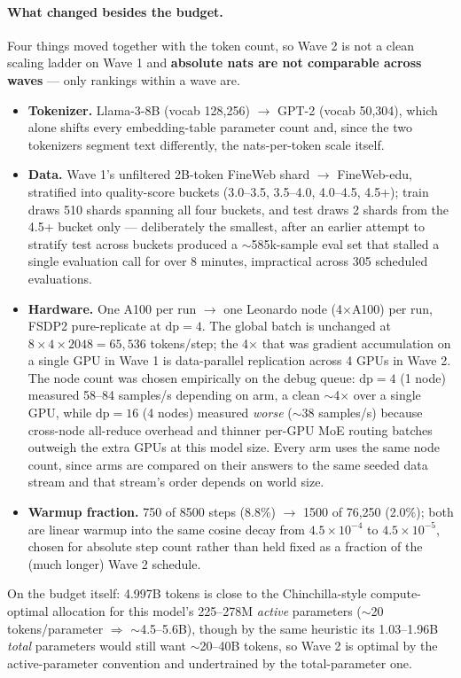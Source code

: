 \documentclass[11pt,a4paper]{article}
\begin{document}
\paragraph{What changed besides the budget.} Four things moved together with the token count, so
Wave 2 is not a clean scaling ladder on Wave 1 and \textbf{absolute nats are not comparable across
waves} --- only rankings within a wave are.
\begin{itemize}
  \item \textbf{Tokenizer.} Llama-3-8B (vocab 128{,}256) $\to$ GPT-2 (vocab 50{,}304), which alone
    shifts every embedding-table parameter count and, since the two tokenizers segment text
    differently, the nats-per-token scale itself.
  \item \textbf{Data.} Wave 1's unfiltered 2B-token FineWeb shard $\to$ FineWeb-edu, stratified into
    quality-score buckets (3.0--3.5, 3.5--4.0, 4.0--4.5, 4.5+); train draws 510 shards spanning all
    four buckets, and test draws 2 shards from the 4.5+ bucket only --- deliberately the smallest,
    after an earlier attempt to stratify test across buckets produced a $\sim$585k-sample eval set
    that stalled a single evaluation call for over 8 minutes, impractical across 305 scheduled
    evaluations.
  \item \textbf{Hardware.} One A100 per run $\to$ one Leonardo node (4$\times$A100) per run, FSDP2
    pure-replicate at $\text{dp}=4$. The global batch is unchanged at $8 \times 4 \times 2048 =
    65{,}536$ tokens/step; the 4$\times$ that was gradient accumulation on a single GPU in Wave 1 is
    data-parallel replication across 4 GPUs in Wave 2. The node count was chosen empirically on the
    debug queue: $\text{dp}=4$ (1 node) measured 58--84 samples/s depending on arm, a clean
    $\sim$4$\times$ over a single GPU, while $\text{dp}=16$ (4 nodes) measured \emph{worse}
    ($\sim$38 samples/s) because cross-node all-reduce overhead and thinner per-GPU MoE routing
    batches outweigh the extra GPUs at this model size. Every arm uses the same node count, since
    arms are compared on their answers to the same seeded data stream and that stream's order
    depends on world size.
  \item \textbf{Warmup fraction.} 750 of 8500 steps (8.8\%) $\to$ 1500 of 76{,}250 (2.0\%); both are
    linear warmup into the same cosine decay from $4.5\times10^{-4}$ to $4.5\times10^{-5}$, chosen
    for absolute step count rather than held fixed as a fraction of the (much longer) Wave 2
    schedule.
\end{itemize}
On the budget itself: 4.997B tokens is close to the Chinchilla-style compute-optimal allocation for
this model's 225--278M \emph{active} parameters ($\sim$20 tokens/parameter $\Rightarrow$
$\sim$4.5--5.6B), though by the same heuristic its 1.03--1.96B \emph{total} parameters would still
want $\sim$20--40B tokens, so Wave 2 is optimal by the active-parameter convention and undertrained
by the total-parameter one.
\end{document}
